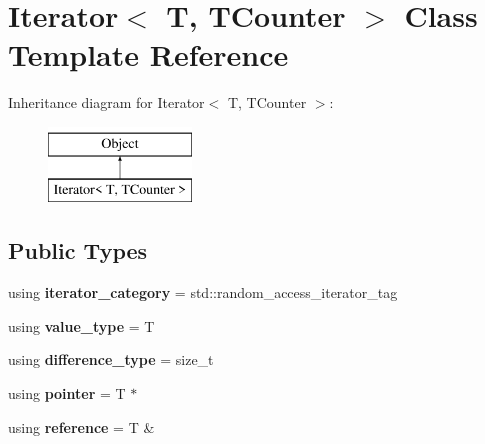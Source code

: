 \hypertarget{classIterator}{}\section{Iterator$<$ T, T\+Counter $>$ Class Template Reference}
\label{classIterator}
Inheritance diagram for Iterator$<$ T, T\+Counter $>$\+:\begin{figure}[H]
\begin{center}
\leavevmode
\includegraphics[height=2.000000cm]{classIterator}
\end{center}
\end{figure}
\subsection*{Public Types}
\begin{DoxyCompactItemize}
\item 
\hypertarget{classIterator_adef9395a4e35c735309294edc6dad06c}{}\label{classIterator_adef9395a4e35c735309294edc6dad06c} 
using {\bfseries iterator\+\_\+category} = std\+::random\+\_\+access\+\_\+iterator\+\_\+tag
\item 
\hypertarget{classIterator_a28722a581d52ff575f1d43119a9e9b76}{}\label{classIterator_a28722a581d52ff575f1d43119a9e9b76} 
using {\bfseries value\+\_\+type} = T
\item 
\hypertarget{classIterator_a4c323bdde2a1bb4e30f7cb16bfd9fc75}{}\label{classIterator_a4c323bdde2a1bb4e30f7cb16bfd9fc75} 
using {\bfseries difference\+\_\+type} = size\+\_\+t
\item 
\hypertarget{classIterator_aa550510e9ce3c7eb4bcf82f3a87f6e00}{}\label{classIterator_aa550510e9ce3c7eb4bcf82f3a87f6e00} 
using {\bfseries pointer} = T $\ast$
\item 
\hypertarget{classIterator_a6728a45fa20acfeedfde569360e2e5b3}{}\label{classIterator_a6728a45fa20acfeedfde569360e2e5b3} 
using {\bfseries reference} = T \&
\end{DoxyCompactItemize}

